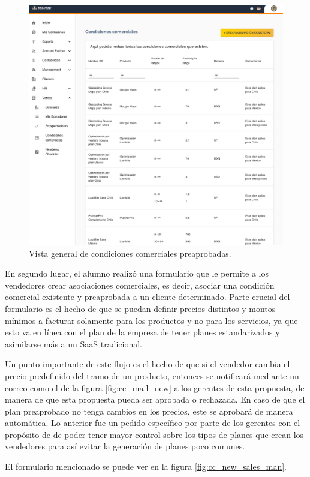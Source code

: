     \begin{figure}[H]
      \centering
      \includegraphics[width=0.6\linewidth]{figures/cc/vistas/cc_visible.png}
      \caption{Vista general de condiciones comerciales preaprobadas.}
      \label{fig:cc_visible}
    \end{figure}

    En segundo lugar, el alumno realizó una formulario que le permite a los vendedores crear asociaciones comerciales, es decir, asociar una condición comercial existente y preaprobada a un cliente determinado. Parte crucial del formulario es el hecho de que se puedan definir precios distintos y montos mínimos a facturar solamente para los productos y no para los servicios, ya que esto va en línea con el plan de la empresa de tener planes estandarizados y asimilarse más a un SaaS tradicional. 
    
    Un punto importante de este flujo es el hecho de que si el vendedor cambia el precio predefinido del tramo de un producto, entonces se notificará mediante un correo como el de la figura \ref{fig:cc_mail_new} a los gerentes de esta propuesta, de manera de que esta propuesta pueda ser aprobada o rechazada. En caso de que el plan preaprobado no tenga cambios en los precios, este se aprobará de manera automática. Lo anterior fue un pedido específico por parte de los gerentes con el propósito de de poder tener mayor control sobre los tipos de planes que crean los vendedores para así evitar la generación de planes poco comunes. 
    
    El formulario mencionado se puede ver en la figura \ref{fig:cc_new_sales_man}.

